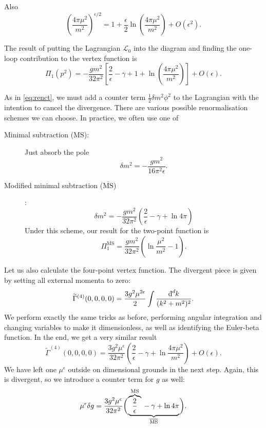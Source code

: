 Also
 \begin{equation}
   \left( \frac{4 \pi \mu^2}{m^2} \right)^{\epsilon / 2} = 1 + \frac{\epsilon}{2} \ln(\frac{4\pi \mu^2}{m^2}) + O(\epsilon^2).
\end{equation} 

The result of putting the Lagrangian $\mathscr{L}_0$ into the diagram and finding the one-loop contribution to the vertex function is
\begin{equation}
  \Pi_1(p^2) = -\frac{g m^2}{32 \pi^2} \left[ \frac{2}{\epsilon} - \gamma + 1 + \ln(\frac{4\pi\mu^2}{m^2}) \right] + O(\epsilon).
\end{equation}

As in \eqref{eq:renct}, we must add a counter term $\frac{1}{2} \delta m^2 \phi^2$ to the Lagrangian with the intention to cancel the divergence.
There are various possible renormalisation schemes we can choose. In practice, we often use one of
\begin{description}
  \item[Minimal subtraction (MS):]  Just absorb the pole
    \begin{equation}
      \delta m^2 = - \frac{g m^2}{16 \pi^2 \epsilon}.
    \end{equation}
  \item[Modified minimal subtraction ($\overline{\text{MS}}{}$)]:
    \begin{equation}
      \delta m^2 = - \frac{g m^2}{32 \pi^2} \left( \frac{2}{\epsilon} - \gamma + \ln 4 \pi \right)
    \end{equation}
    Under this scheme, our result for the two-point function is
    \begin{equation}
      \Pi_1^{\overline{\text{MS}}{}} = \frac{g m^2}{32 \pi^2} \left( \ln \frac{\mu^2}{m^2} - 1 \right).
    \end{equation}
\end{description}

Let us also calculate the four-point vertex function.
The divergent piece is given by setting all external momenta to zero:
\begin{equation}
  \widetilde{\Gamma}^{(4)} (0,0,0,0) = \frac{3 g^2 \mu^{2 \epsilon}}{2} \int \frac{\bdd[d]{k}}{(k^2 + m^2)^2}.
\end{equation}
We perform exactly the same tricks as before, performing angular integration and changing variables to make it dimensionless, as well as identifying the Euler-beta function.
In the end, we get a very similar result
\begin{equation}
  \widetilde{\Gamma}^{(4)} (0,0,0,0) = \frac{3 g^2 \mu^\epsilon}{32 \pi^2} \left( \frac{2}{\epsilon} - \gamma + \ln \frac{4 \pi \mu^2}{m^2} \right) + O(\epsilon).
\end{equation}
We have left one $\mu^\epsilon$ outside on dimensional grounds in the next step.
Again, this is divergent, so we introduce a counter term for $g$ as well:
\begin{equation}
  \label{eq:11-dg}
  \mu^\epsilon \delta g = \frac{3 g^2 \mu^{\epsilon}}{32 \pi^2} \biggl( \underbrace{ \overbrace{\frac{2}{\epsilon}}^{\mathclap{\text{MS}}} {} - \gamma + \ln 4 \pi }_{\mathclap{\overline{\text{MS}}{}}} \biggr).
\end{equation}

